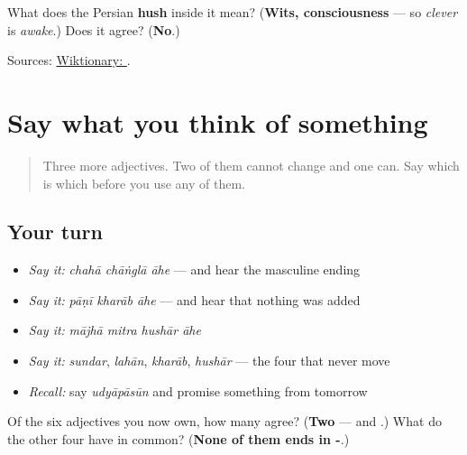 \begin{tcolorbox}[breakable,colback=teal!4,colframe=teal!35!black,title={Before you move on}]
What does the Persian \textbf{hush} inside it mean? (\textbf{Wits, consciousness} — so \emph{clever} is \emph{awake}.) Does it agree? (\textbf{No}.)

Sources: \href{https://en.wiktionary.org/wiki/\%E0\%A4\%B9\%E0\%A5\%81\%E0\%A4\%B6\%E0\%A4\%BE\%E0\%A4\%B0}{Wiktionary: }.
\end{tcolorbox}
\section[\texorpdfstring{\mr{चांगला} · \mr{खराब} … (chāṅglā · kharāb …)}{चांगला · खराब … (chāṅglā · kharāb …)}]{Say what you think of something}

\label{lesson:MR-R51-good-and-bad}



\begin{quote}
Three more adjectives. Two of them cannot change and one can. Say which is which before you use any of them.
\end{quote}

\subsection*{Your turn}
\begin{itemize}
\raggedright
  \item \emph{Say it:} \emph{chahā chāṅglā āhe} — and hear the masculine ending
  \item \emph{Say it:} \emph{pāṇī kharāb āhe} — and hear that nothing was added
  \item \emph{Say it:} \emph{mājhā mitra hushār āhe}
  \item \emph{Say it:} \emph{sundar}, \emph{lahān}, \emph{kharāb}, \emph{hushār} — the four that never move
  \item \emph{Recall:} say \emph{udyāpāsūn} and promise something from tomorrow
\end{itemize}

\begin{tcolorbox}[breakable,colback=teal!4,colframe=teal!35!black,title={Before you move on}]
Of the six adjectives you now own, how many agree? (\textbf{Two} — \textbf{} and \textbf{}.) What do the other four have in common? (\textbf{None of them ends in -}.)
\end{tcolorbox}
